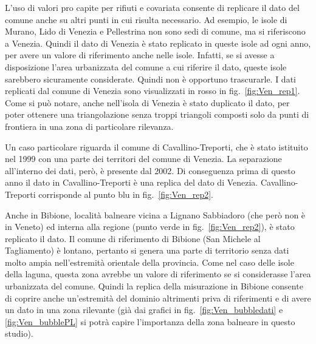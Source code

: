 \documentclass[a4paper,11pt,twoside,openright]{book}							%
\begin{document}
L'uso di valori pro capite per rifiuti e covariata consente di replicare il dato del comune anche su altri punti in cui risulta necessario. Ad esempio, le isole di Murano, Lido di Venezia e Pellestrina non sono sedi di comune, ma si riferiscono a Venezia. Quindi il dato di Venezia è stato replicato in queste isole ad ogni anno, per avere un valore di riferimento anche nelle isole. Infatti, se si avesse a disposizione l'area urbanizzata del comune a cui riferire il dato, queste isole sarebbero sicuramente considerate. Quindi non è opportuno trascurarle. I dati replicati dal comune di Venezia sono visualizzati in rosso in fig.~\ref{fig:Ven_rep1}. Come si può notare, anche nell'isola di Venezia è stato duplicato il dato, per poter ottenere una triangolazione senza troppi triangoli composti solo da punti di frontiera in una zona di particolare rilevanza. 

Un caso particolare riguarda il comune di Cavallino-Treporti, che è stato istituito nel 1999 con una parte dei territori del comune di Venezia. La separazione all'interno dei dati, però, è presente dal 2002. Di conseguenza prima di questo anno il dato in Cavallino-Treporti è una replica del dato di Venezia. Cavallino-Treporti corrisponde al punto blu in fig.~\ref{fig:Ven_rep2}.

Anche in Bibione, località balneare vicina a Lignano Sabbiadoro (che però non è in Veneto) ed interna alla regione (punto verde in fig.~\ref{fig:Ven_rep2}), è stato replicato il dato. Il comune di riferimento di Bibione (San Michele al Tagliamento) è lontano, pertanto si genera una parte di territorio senza dati molto ampia nell'estremità orientale della provincia. Come nel caso delle isole della laguna, questa zona avrebbe un valore di riferimento se si considerasse l'area urbanizzata del comune. Quindi la replica della misurazione in Bibione consente di coprire anche un'estremità del dominio altrimenti priva di riferimenti e di avere un dato in una zona rilevante (già dai grafici in fig.~\ref{fig:Ven_bubbledati} e \ref{fig:Ven_bubblePL} si potrà capire l'importanza della zona balneare in questo studio).
\end{document}
